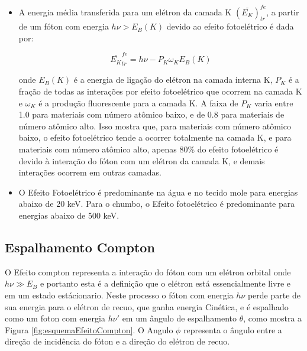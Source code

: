 \documentclass[11pt,a4paper]{article}
\begin{document}
            \begin{itemize}
                \item A energia média transferida para um elétron da camada K $(\bar{E_K})_{tr}^{fe}$, a partir de um fóton com energia $h \nu > E_B(K)$ devido ao efeito fotoelétrico é dada por:
                
                    \begin{equation}
                        \bar{E_K}_{tr}^{fe} = h\nu - P_K \omega_K E_B(K)
                    \end{equation}

                \noindent onde $E_B(K)$ é a energia de ligação do elétron na camada interna K, $P_K$ é a fração de todas as interações por efeito fotoelétrico que ocorrem na camada K e $\omega_K$ é a produção fluorescente para a camada K. A faixa de $P_K$ varia entre 1.0 para materiais com número atômico baixo, e de 0.8 para materiais de número atômico alto. Isso mostra que, para materiais com número atômico baixo, o efeito fotoelétrico tende a ocorrer totalmente na camada K, e para materiais com número atômico alto, apenas 80\% do efeito fotoelétrico é devido à interação do fóton com um elétron da camada K, e demais interações ocorrem em outras camadas. 

                \item O Efeito Fotoelétrico é predominante na água e no tecido mole para energias abaixo de 20 keV. Para o chumbo, o Efeito fotoelétrico é predominante para energias abaixo de 500 keV.
            \end{itemize}

        \subsection{Espalhamento Compton}

            O Efeito compton representa a interação do fóton com um elétron orbital onde  $h\nu \gg E_B $ e portanto esta é a definição que o elétron está essencialmente livre e em um estado estácionario. Neste processo o fóton com  energia $h\nu$ perde parte de sua energia para o elétron de recuo, que ganha energia Cinética, e é espalhado  como um  foton com energia $h\nu'$  em um ângulo de espalhamento $\theta$, como mostra a Figura \ref{fig:esquemaEfeitoCompton}. O Angulo $\phi$ representa o ângulo entre a direção de incidência do fóton e a direção do elétron de recuo. 
\end{document}
